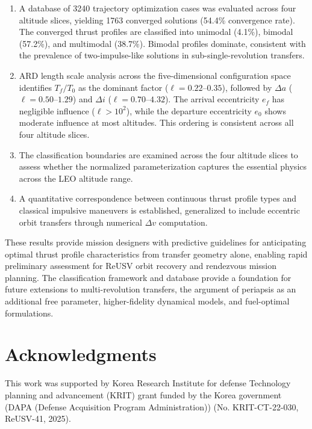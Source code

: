 \documentclass[a4paper,fleqn]{cas-dc}
\begin{document}
\begin{enumerate}
\item A database of 3240 trajectory optimization cases was evaluated across four altitude slices, yielding 1763 converged solutions (54.4\% convergence rate). The converged thrust profiles are classified into unimodal (4.1\%), bimodal (57.2\%), and multimodal (38.7\%). Bimodal profiles dominate, consistent with the prevalence of two-impulse-like solutions in sub-single-revolution transfers.

\item ARD length scale analysis across the five-dimensional configuration space identifies $T_f/T_0$ as the dominant factor ($\ell = 0.22$--$0.35$), followed by $\Delta a$ ($\ell = 0.50$--$1.29$) and $\Delta i$ ($\ell = 0.70$--$4.32$). The arrival eccentricity $e_f$ has negligible influence ($\ell > 10^2$), while the departure eccentricity $e_0$ shows moderate influence at most altitudes. This ordering is consistent across all four altitude slices.

\item The classification boundaries are examined across the four altitude slices to assess whether the normalized parameterization captures the essential physics across the LEO altitude range.

\item A quantitative correspondence between continuous thrust profile types and classical impulsive maneuvers is established, generalized to include eccentric orbit transfers through numerical $\Delta v$ computation.
\end{enumerate}

These results provide mission designers with predictive guidelines for anticipating optimal thrust profile characteristics from transfer geometry alone, enabling rapid preliminary assessment for ReUSV orbit recovery and rendezvous mission planning. The classification framework and database provide a foundation for future extensions to multi-revolution transfers, the argument of periapsis as an additional free parameter, higher-fidelity dynamical models, and fuel-optimal formulations.


\section*{Acknowledgments}
This work was supported by Korea Research Institute for defense Technology planning and advancement (KRIT) grant funded by the Korea government (DAPA (Defense Acquisition Program Administration)) (No. KRIT-CT-22-030, ReUSV-41, 2025).
\end{document}
